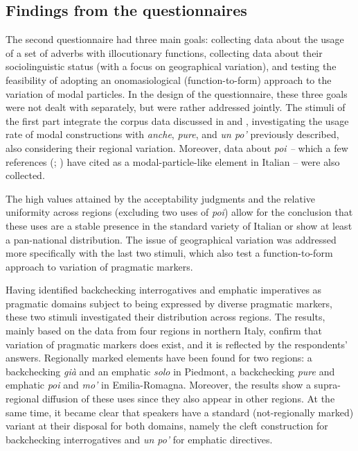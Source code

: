 \subsection{Findings from the questionnaires}
\hypertarget{Toc124860690}{}
The second questionnaire had three main goals: collecting data about the usage of a set of adverbs with illocutionary functions, collecting data about their sociolinguistic status (with a focus on geographical variation), and testing the feasibility of adopting an onomasiological (function-to-form) approach to the variation of modal particles. In the design of the questionnaire, these three goals were not dealt with separately, but were rather addressed jointly. The stimuli of the first part integrate the corpus data discussed in  and , investigating the usage rate of modal constructions with \textit{anche}, \textit{pure}, and \textit{un po’} previously described, also considering their regional variation. Moreover, data about \textit{poi –} which a few references (\citealt{Bazzanella1995}; \citealt{Coniglio2008}) have cited as a modal-particle-like element in Italian – were also collected.

The high values attained by the acceptability judgments and the relative uniformity across regions (excluding two uses of \textit{poi}) allow for the conclusion that these uses are a stable presence in the standard variety of Italian or show at least a pan-national distribution. The issue of geographical variation was addressed more specifically with the last two stimuli, which also test a function-to-form approach to variation of pragmatic markers.

Having identified backchecking interrogatives and emphatic imperatives as pragmatic domains subject to being expressed by diverse pragmatic markers, these two stimuli investigated their distribution across regions. The results, main\-ly based on the data from four regions in northern Italy, confirm that variation of pragmatic markers does exist, and it is reflected by the respondents’ answers. Regionally marked elements have been found for two regions: a backchecking \textit{già} and an emphatic \textit{solo} in Piedmont, a backchecking \textit{pure} and emphatic \textit{poi} and \textit{mo’} in Emilia-Romagna. Moreover, the results show a supra-regional diffusion of these uses since they also appear in other regions. At the same time, it became clear that speakers have a standard (not-regionally marked) variant at their disposal for both domains, namely the cleft construction for backchecking interrogatives and \textit{un po’} for emphatic directives.

